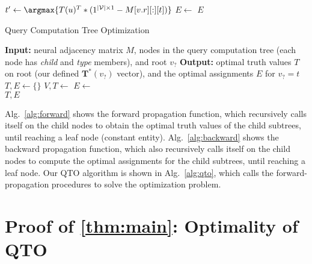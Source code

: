 \begin{minipage}[!h]{\textwidth}
\begin{minipage}{.48\textwidth}
\begin{algorithm}[H]
\begin{algorithmic}
   \State $t'\leftarrow \argmax\{T(u)^T * (1^{|\mathcal{V}|\times1}-M[v.r][:][t])\}$
   \State $E\leftarrow$
   \EndIf
   \EndIf
   \Return $E$
   \EndFunction
\end{algorithmic}
\end{algorithm}
\begin{algorithm}[H]
\small
\caption{Query Computation Tree Optimization}
\label{alg:qto}
\begin{algorithmic}
   \State \textbf{Input:} neural adjacency matrix $M$, nodes in the query computation tree (each node has \emph{child} and \emph{type} members), and root $v_?$
   \State \textbf{Output: } optimal truth values $T$ on root (our defined $\mathbf{T}^*(v_?)$ vector), and the optimal assignments $E$ for $v_?=t$
   \State $T, E\leftarrow \{\}$
   \State $V, T\leftarrow$
   \State $E\leftarrow$ \\
   \Return $T, E$
\end{algorithmic}
\end{algorithm}
\vfill
\end{minipage}
\end{minipage}

Alg.~\ref{alg:forward} shows the forward propagation function, which recursively calls itself on the child nodes to obtain the optimal truth values of the child subtrees, until reaching a leaf node (constant entity).
Alg.~\ref{alg:backward} shows the backward propagation function, which also recursively calls itself on the child nodes to compute the optimal assignments for the child subtrees, until reaching a leaf node.
Our QTO algorithm is shown in Alg.~\ref{alg:qto}, which calls the forward-propagation procedures to solve the optimization problem.

\section{Proof of \cref{thm:main}: Optimality of QTO}
\label{app:thm}

